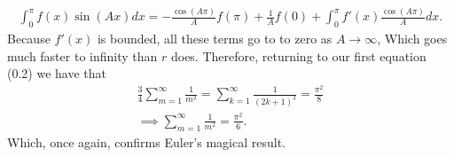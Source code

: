 \documentclass[12pt,oneside]{amsart}
\theoremstyle{definition}
\theoremstyle{remark}
\numberwithin{equation}{exer}
\newcommand{\smm}{\sum_{m=1}^\infty}
\begin{document}
\begin{align*}
    \int_0^\pi f(x) \sin{(Ax)}dx = -\frac{\cos{(A\pi)}}{A}f(\pi) +\frac{1}{A}f(0) + \int_0^\pi f'(x) \frac{\cos{(A\pi)}}{A}dx.
\end{align*}
\indent 
Because $f'(x)$ is bounded, all these terms go to to zero as $A \to \infty$, Which goes much faster to infinity than $r$ does. 
\newline\indent
Therefore, returning to our first equation (0.2) we have that 
\begin{align*}
    \frac{3}{4}\smm \frac{1}{m^2} = \sum_{k=1}^\infty \frac{1}{(2k+1)^2} = \frac{\pi^2}{8}\\
    \implies \smm \frac{1}{m^2} = \frac{\pi^2}{6}.
\end{align*}
Which, once again, confirms Euler's magical result. \cite{MR2916494}









\newpage
\end{document}
